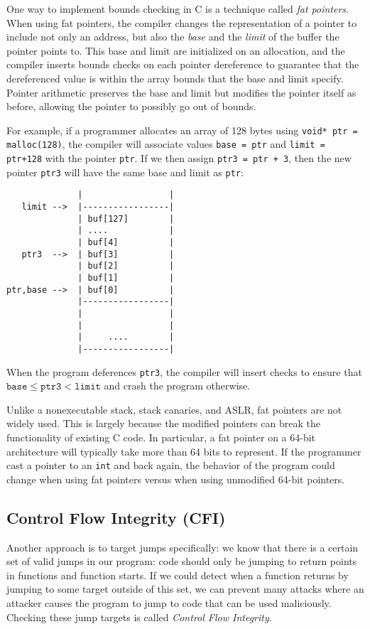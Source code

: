 One way to implement bounds checking in C is a technique called \emph{fat pointers}.
When using fat pointers, the compiler changes the representation of a
pointer to include not only an address, but also the \emph{base} and the 
\emph{limit} of the buffer the pointer points to.
This base and limit are initialized on an allocation, and the compiler inserts bounds checks on each pointer dereference to guarantee that the dereferenced value is within the array bounds that the base and limit specify.
 Pointer arithmetic preserves the base and limit but modifies the pointer itself as before, allowing the pointer to possibly go out of bounds.

For example, if a programmer allocates an array of 128 bytes
using \texttt{void* ptr = malloc(128)}, the compiler will
associate values \texttt{base = ptr} and \texttt{limit = ptr+128}
with the pointer \texttt{ptr}.
If we then assign \texttt{ptr3 = ptr + 3}, then the new
pointer \texttt{ptr3} will have the same base and limit 
as \texttt{ptr}:
\begin{verbatim}
              |                 |
   limit -->  |-----------------|
              | buf[127]        |
              | ....            |
              | buf[4]          |
   ptr3  -->  | buf[3]          |
              | buf[2]          |
              | buf[1]          |
ptr,base -->  | buf[0]          |
              |-----------------|
              |                 |
              |                 |
              |     ....        |
              |-----------------|
\end{verbatim}
When the program deferences \texttt{ptr3}, the compiler will insert
checks to ensure that $\texttt{base} \leq \texttt{ptr3} < \texttt{limit}$
and crash the program otherwise.

Unlike a nonexecutable stack, stack canaries, and ASLR, fat pointers are not widely used. This is largely because the modified  pointers 
can break the functionality of existing C code.
In particular, a fat pointer on a 64-bit architecture will typically take more than
64 bits to represent.
If the programmer cast a pointer to an \texttt{int} and back again, 
the behavior of the program could change when using fat pointers 
versus when using unmodified 64-bit pointers.

\subsection{Control Flow Integrity (CFI)}
Another approach is to target jumps specifically: we know that there is a certain set of valid jumps in our program: code should only be jumping to return points in functions and function starts. If we could detect when a function returns by jumping to some target outside of this set, we can prevent many attacks where an attacker causes the program to jump to code that can be used maliciously. Checking these jump targets is called \emph{Control Flow Integrity}.


